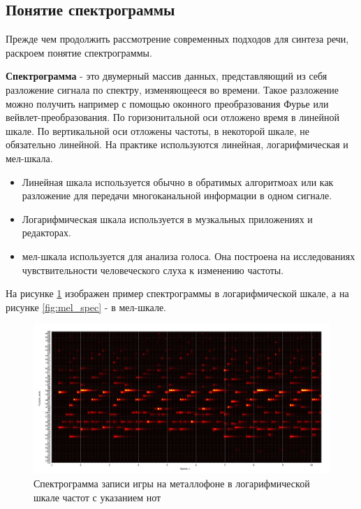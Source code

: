 \subsection{Понятие спектрограммы}
Прежде чем продолжить рассмотрение современных подходов для синтеза речи, раскроем понятие спектрограммы.

\textbf{Спектрограмма} - это двумерный массив данных, представляющий из себя разложение сигнала по спектру, изменяющееся во времени.
Такое разложение можно получить например с помощью оконного преобразования Фурье или вейвлет-преобразования. 
По горизонитальной оси отложено время в линейной шкале. По вертикальной оси отложены частоты, в некоторой шкале, не обязательно линейной.
На практике используются линейная, логарифмическая и мел-шкала.
\begin{itemize}
  \item Линейная шкала используется обычно в обратимых алгоритмоах или как разложение для передачи многоканальной информации в одном сигнале.
  \item Логарифмическая шкала используется в музкальных приложениях и редакторах.
  \item мел-шкала используется для анализа голоса. Она построена на исследованиях чувствительности человеческого слуха к изменению частоты.
\end{itemize}

На рисунке \ref{fig:log_spec} изображен пример спектрограммы в логарифмической шкале, а на рисунке \ref{fig:mel_spec} - в мел-шкале.
\begin{figure}
  \centering
  \includegraphics[width=16cm]{figures/log_spec}
  \caption{Спектрограмма записи игры на металлофоне в логарифмической шкале частот с указанием нот}
  \label{fig:log_spec}
\end{figure}

